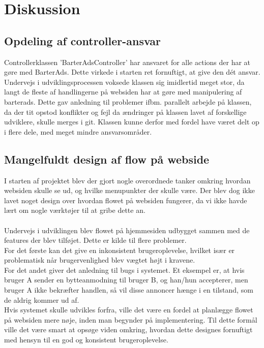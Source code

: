 \chapter{Diskussion}




\section{Opdeling af controller-ansvar}
Controllerklassen 'BarterAdsController' har ansvaret for alle actions der har at gøre med BarterAds. Dette virkede i starten ret fornuftigt, at give den dét ansvar. Undervejs i udviklingsprocessen voksede klassen sig imidlertid meget stor, da langt de fleste af handlingerne på websiden har at gøre med manipulering af barterads. Dette gav anledning til problemer ifbm. parallelt arbejde på klassen, da der tit opstod konflikter og fejl da ændringer på klassen lavet af forskellige udviklere, skulle merges i git. Klassen kunne derfor med fordel have været delt op i flere dele, med meget mindre ansvarsområder.


\section{Mangelfuldt design af flow på webside}
I starten af projektet blev der gjort nogle overordnede tanker omkring hvordan websiden skulle se ud, og hvilke menupunkter der skulle være. Der blev dog ikke lavet noget design over hvordan flowet på websiden fungerer, da vi ikke havde lært om nogle værktøjer til at gribe dette an. \\ \\
Undervejs i udviklingen blev flowet på hjemmesiden udbygget sammen med de features der blev tilføjet. Dette er kilde til flere problemer. \\
For det første kan det give en inkonsistent brugeroplevelse, hvilket især er problematisk når brugervenlighed blev vægtet højt i kravene. \\
For det andet giver det anledning til bugs i systemet. Et eksempel er, at hvis bruger A sender en bytteanmodning til bruger B, og han/hun accepterer, men bruger A ikke bekræfter handlen, så vil disse annoncer hænge i en tilstand, som de aldrig kommer ud af.\\

Hvis systemet skulle udvikles forfra, ville det være en fordel at planlægge flowet på websiden mere nøje, inden man begynder på implementering. Til dette formål ville det være smart at opsøge viden omkring, hvordan dette designes fornuftigt med hensyn til en god og konsistent brugeroplevelse.

